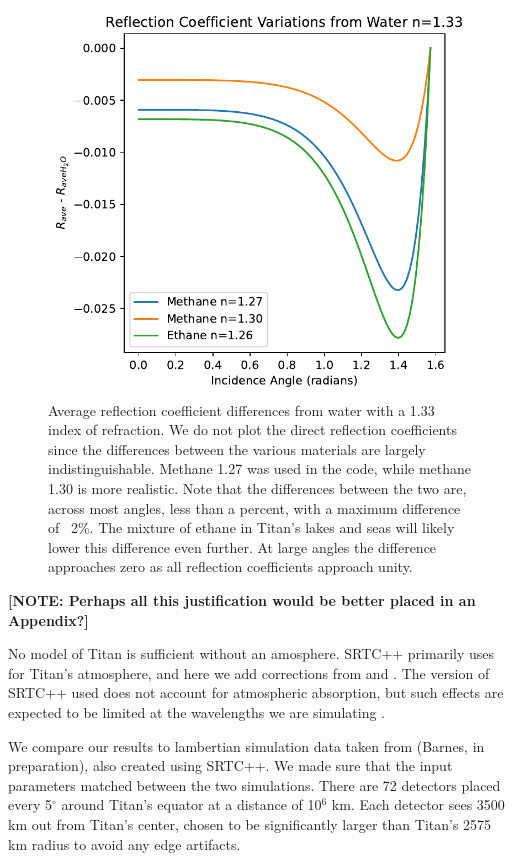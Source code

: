 \documentclass[twocolumn,linenumbers]{aastex631}
\begin{document}
\begin{figure}[htbp]
\includegraphics[scale = 0.5]{ReflectionVariations.pdf}
\centering
\caption{Average reflection coefficient differences from water with a 1.33 index of refraction. We do not plot the direct reflection coefficients since the differences between the various materials are largely indistinguishable. Methane 1.27 was used in the code, while methane 1.30 is more realistic. Note that the differences between the two are, across most angles, less than a percent, with a maximum difference of ~2\%. The mixture of ethane in Titan's lakes and seas will likely lower this difference even further. At large angles the difference approaches zero as all reflection coefficients approach unity.}
\label{fig:4}
\end{figure}

\textbf{\color{red} [NOTE: Perhaps all this justification would be better placed in an Appendix?] \color{black}}

No model of Titan is sufficient without an amosphere. SRTC++ primarily uses \cite{Tomasko2008} for Titan's atmosphere, and here we add corrections from \cite{Hirtzig2013} and \cite{Rodriguez2018}. The version of SRTC++ used does not account for atmospheric absorption, but such effects are expected to be limited at the wavelengths we are simulating \citep{EsSayeh2023}.

We compare our results to lambertian simulation data taken from (Barnes, in preparation), also created using SRTC++. We made sure that the input parameters matched between the two simulations. There are 72 detectors placed every 5$^{\circ}$ around Titan's equator at a distance of 10$^6$ km. Each detector sees 3500 km out from Titan's center, chosen to be significantly larger than Titan's 2575 km radius to avoid any edge artifacts.
\end{document}
